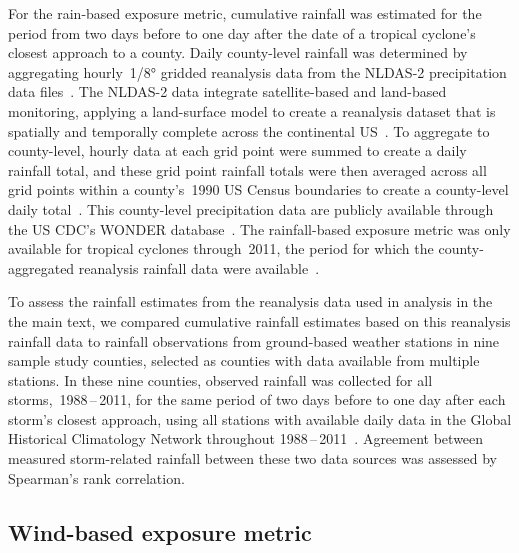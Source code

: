 For the rain-based exposure metric, cumulative rainfall was estimated for the
period from two days before to one day after the date of a tropical cyclone's
closest approach to a county. Daily county-level rainfall was determined by
aggregating hourly~1/8\si{\degree} gridded reanalysis data from the \ac{NLDAS-2}
precipitation data files~\parencite{rui2013nldas}. The \ac{NLDAS-2} data integrate
satellite-based and land-based monitoring, applying a land-surface model to
create a reanalysis dataset that is spatially and temporally complete across
the continental \ac{US}~\parencite{rui2013nldas, alhamdan2014environmental}. To
aggregate to county-level, hourly data at each grid point were summed to create
a daily rainfall total, and these grid point rainfall totals were then averaged
across all grid points within a county's~1990 \ac{US} Census boundaries to
create a county-level daily total~\parencite{alhamdan2014environmental, cdcwonder}.
This county-level precipitation data are publicly available through the \ac{US}
\ac{CDC}'s \ac{WONDER} database~\parencite{cdcwonder, alhamdan2014environmental}.
The rainfall-based exposure metric was only available for tropical cyclones
through~2011, the period for which the county-aggregated reanalysis rainfall
data were available~\parencite{cdcwonder, alhamdan2014environmental}. 

To assess the rainfall estimates from the reanalysis data used in analysis in
the the main text, we compared cumulative rainfall estimates based on this
reanalysis rainfall data to rainfall observations from ground-based weather
stations in nine sample study counties, selected as counties with data
available from multiple stations. In these nine counties, observed rainfall was
collected for all storms,~1988\,--\,2011, for the same period of two days
before to one day after each storm's closest approach, using all stations with
available daily data in the Global Historical Climatology Network throughout
1988\,--\,2011~\parencite{menne2012overview, rnoaa, countyweather}. Agreement
between measured storm-related rainfall between these two data sources was
assessed by Spearman's rank correlation. 

\subsection*{Wind-based exposure metric}

